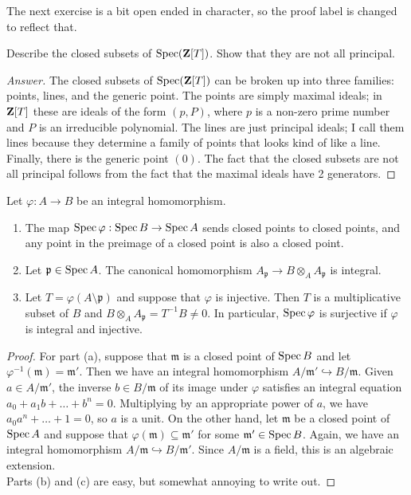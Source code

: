The next exercise is a bit open ended in character, so the proof label is
changed to reflect that.

\begin{exer}
	Describe the closed subsets of $\operatorname{Spec}(\mathbf{Z}[T])$. Show that they are not
	all principal.
\end{exer}
\begin{proof}[Answer]
	The closed subsets of $\operatorname{Spec}(\mathbf{Z}[T])$ can be broken up into three
	families: points, lines, and the generic point. The points are simply
	maximal ideals; in $\mathbf{Z}[T]$ these are ideals of the form $(p, P)$, where
	$p$ is a non-zero prime number and $P$ is an irreducible polynomial. The
	lines are just principal ideals; I call them lines because they
	determine a family of points that looks kind of like a line. Finally,
	there is the generic point $(0)$. The fact that the closed subsets are
	not all principal follows from the fact that the maximal ideals have
	2 generators.
\end{proof}

\begin{exer}
	Let $\varphi : A \to B$ be an integral homomorphism.
	\begin{enumerate}[label=(\alph*)]
		\item The map $\operatorname{Spec} \varphi: \operatorname{Spec} B \to \operatorname{Spec} A$ sends closed
			points to closed points, and any point in the preimage
			of a closed point is also a closed point.
		\item Let $\mathfrak p \in \operatorname{Spec} A$. The canonical homomorphism
			$A_\mathfrak p \to B \otimes_A A_\mathfrak p$ is
			integral.
		\item Let $T = \varphi(A \setminus \mathfrak p)$ and suppose
			that $\varphi$ is injective. Then $T$ is a
			multiplicative subset of $B$ and $B \otimes_A
			A_\mathfrak p = T^{-1}B \neq 0$. In particular,
			$\operatorname{Spec} \varphi$ is surjective if $\varphi$ is integral
			and injective.
	\end{enumerate}
\end{exer}
\begin{proof}
	For part (a), suppose that $\mathfrak m$ is a closed point of $\operatorname{Spec} B$ 	and let $\varphi^{-1}(\mathfrak m) = \mathfrak m'$. Then we have
	an integral homomorphism $A/\mathfrak m' \hookrightarrow B/\mathfrak m$.
	Given $a \in A/\mathfrak m'$, the inverse $b \in B/\mathfrak m$ of its
	image under $\varphi$ satisfies an integral equation
	$a_0 + a_1b + \ldots + b^n = 0$. Multiplying by an appropriate power of
	$a$, we have $a_0a^n + \ldots + 1 = 0$, so $a$ is a unit. On the other
	hand, let $\mathfrak m$ be a closed point of $\operatorname{Spec} A$ and suppose that
	$\varphi(\mathfrak m) \subseteq \mathfrak m'$ for some $\mathfrak m' \in
	\operatorname{Spec} B$. Again, we have an integral homomorphism $A/\mathfrak m 
	\hookrightarrow B/\mathfrak m'$. Since $A/\mathfrak m$ is a field, this
	is an algebraic extension.\\

	Parts (b) and (c) are easy, but somewhat annoying to write out.
\end{proof}

